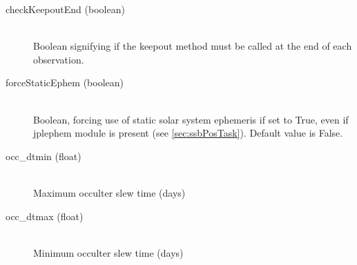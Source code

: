 \documentclass[cleanfoot]{asme2ej}
\begin{document}
\begin{itemize}
\begin{description}
    \item[checkKeepoutEnd (boolean)] \hfill \\ Boolean signifying if the keepout method must be called at the end of each observation.
    \item[forceStaticEphem (boolean)] \hfill \\ Boolean, forcing use of static solar system ephemeris if set to True, even if jplephem module is present (see \ref{sec:ssbPosTask}).  Default value is False.
    \item[occ\_dtmin (float)] \hfill \\ Maximum occulter slew time (days)
    \item[occ\_dtmax (float)] \hfill \\ Minimum occulter slew time (days)
\end{description}
\end{itemize}
\end{document}
